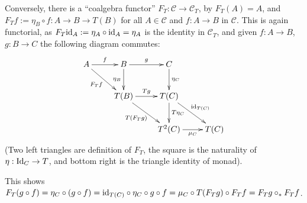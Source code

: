 \documentclass{article}
\begin{document}
Conversely, there is a ``coalgebra functor'' $F_T:\mathcal{C}\rightarrow\mathcal{C}_T$, by $F_T(A) = A$, and $F_T f:= \eta_B\circ f:A\rightarrow B\rightarrow T(B)$ for all $A\in\mathcal{C}$ and $f:A\rightarrow B$ in $\mathcal{C}$. This is again functorial, as $F_T \mathrm{id}_A := \eta_A\circ \mathrm{id}_A = \eta_A$ is the identity in $\mathcal{C}_T$, and given $f:A\rightarrow B$, $g:B\rightarrow C$ the following diagram commutes:
\[\xymatrix{
    A \ar[dr]_-{F_T f} \ar[r]^-{f} & B \ar[d]_-{\eta_B} \ar[r]^-{g} & C\ar[d]^-{\eta_C}\\
    & T(B) \ar[dr]_-{T(F_T g)} \ar[r]^-{Tg} & T(C) \ar[d]^-{T\eta_C} \ar[dr]^-{\id_{T(C)}}\\
    && T^2(C) \ar[r]_-{\mu_C} & T(C)
}\]
(Two left triangles are definition of $F_T$, the square is the naturality of $\eta:\mathrm{Id}_C\rightarrow T$, and bottom right is the triangle identity of monad).

This shows $F_T (g\circ f)=\eta_C\circ (g\circ f)=\mathrm{id}_{T(C)}\circ \eta_C\circ g\circ f = \mu_C \circ T(F_T g)\circ F_T f = F_T g\circ_* F_T f$.
\end{document}
